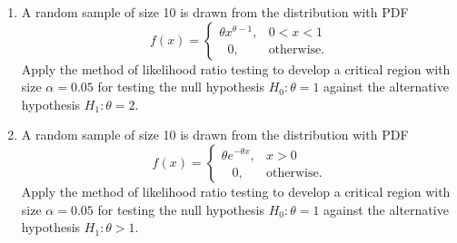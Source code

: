 \documentclass[11pt, a4paper]{article}
\begin{document}
\begin{enumerate}
	
	
	
	
	
	
	
	
	
	
	
	
	\item A random sample of size 10 is drawn from the distribution with PDF 
	\begin{equation*}
	f(x) = 
		\begin{cases}
		\theta x^{\theta - 1}, & 0 < x < 1 \\
		\hspace{8pt} 0, & \text{otherwise.}
		\end{cases}	
	\end{equation*}
	Apply the method of likelihood ratio testing to develop a critical region with size $\alpha = 0.05$ for testing the null hypothesis $H_0 : \theta = 1$ against the alternative hypothesis $H_1 : \theta = 2$.
	
	
	
	
	
	
	
	
	
	
	
	
	
	\item A random sample of size 10 is drawn from the distribution with PDF
	\begin{equation*}
	 f(x) =
		\begin{cases}
		 \theta e^{-\theta x}, & x > 0  \\
		 \hspace{10pt} 0, & \text{otherwise}.
		\end{cases}
	\end{equation*}
	Apply the method of likelihood ratio testing to develop a critical region with size $\alpha = 0.05$ for testing the null hypothesis $H_0 : \theta = 1$ against the alternative hypothesis $H_1 : \theta > 1$.
\end{enumerate}
\end{document}
